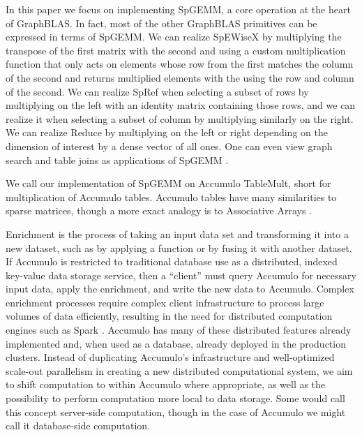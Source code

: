 In this paper we focus on implementing SpGEMM, a core operation at the heart of GraphBLAS.
In fact, most of the other GraphBLAS primitives can be expressed in terms of SpGEMM.
We can realize SpEWiseX by multiplying the transpose of the first matrix with the second
and using a custom multiplication function that only acts on elements whose row from the first 
matches the column of the second and returns multiplied elements with the using the row and column of the second.
We can realize SpRef when selecting a subset of rows by multiplying on the left with an identity matrix containing those rows,
and we can realize it when selecting a subset of column by multiplying similarly on the right.
We can realize Reduce by multiplying on the left or right depending on the dimension of interest by a dense vector of all ones.
One can even view graph search \cite{kepner2011graph} and table joins as applications of SpGEMM \cite{x}.

We call our implementation of SpGEMM on Accumulo TableMult, short for multiplication of Accumulo tables.
Accumulo tables have many similarities to sparse matrices, though a more exact analogy is to Associative Arrays 
\cite{kepner2014gabb}.



Enrichment \cite{x} is the process of taking an input data set and transforming it into a new dataset, such as by 
applying a function or by fusing it with another dataset.
If Accumulo is restricted to traditional database use as a distributed, indexed key-value data storage service,
then a ``client'' must query Accumulo for necessary input data, apply the enrichment, and write the new data 
to Accumulo.  
Complex enrichment processes require complex client infrastructure to process large volumes of data efficiently,
resulting in the need for distributed computation engines such as Spark \cite{x}.
Accumulo has many of these distributed features already implemented and, when used as a database, 
already deployed in the production clusters. 
Instead of duplicating Accumulo's infrastructure and well-optimized scale-out parallelism
in creating a new distributed computational system, we aim to shift computation 
to within Accumulo where appropriate,
as well as the possibility to perform computation more local to data storage.
Some would call this concept server-side computation, though in the case of Accumulo we might call it 
database-side computation.




